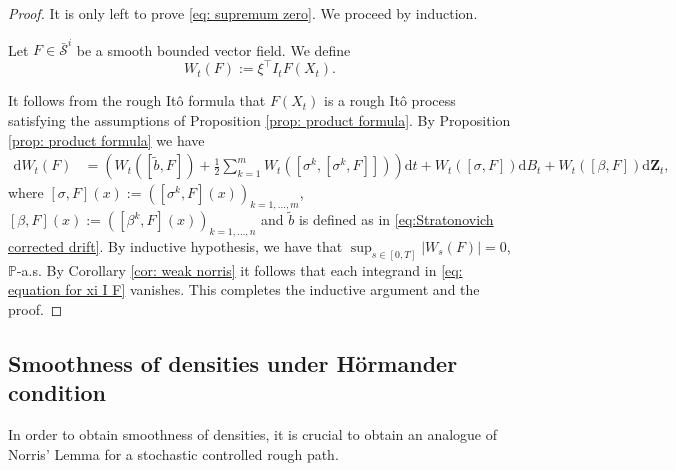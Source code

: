 \documentclass[11pt,a4paper]{article}
\newcommand{\rd}{\mathrm{d}}
\theoremstyle{plain}
\begin{document}
\begin{proof}
    It is only left to prove \eqref{eq: supremum zero}. We proceed by induction.

    Let $F\in \bar{\mathcal{S}}^{i}$ be a smooth  bounded vector field. We define \begin{equation}
    \label{eq: definition of W(F)}
    W_t(F) := \xi^{\top} I_t F(X_t).
    \end{equation}
    
    It follows from the rough It\^o formula \cite[Theorem 4.13]{FHL21} that $F(X_t)$ is a rough It\^o process satisfying the assumptions of Proposition \ref{prop: product formula}.
    By Proposition \ref{prop: product formula} we have
     \begin{align}
    \label{eq: equation for xi I F}
        \rd W_t(F)
        &= 
        \left(W_t([\tilde b,F]) + \frac{1}{2} \sum_{k=1}^{m} W_t([\sigma^k,[\sigma^k,F]])
        \right) \rd t 
         + W_t([\sigma,F]) \rd B_t
        + W_t([\beta,F]) \rd \mathbf{Z}_t,
    \end{align}
    where $[\sigma,F](x) := ([\sigma^k,F](x))_{k=1,\dots,m}$, $[\beta,F](x) := ([\beta^k,F](x))_{k=1,\dots,n}$ and $\tilde b$ is defined as in \eqref{eq:Stratonovich corrected drift}.
    By inductive hypothesis, we have that $\sup_{s\in[0,T]}|W_s(F)| = 0$, $\mathbb{P}$-a.s. By Corollary \ref{cor: weak norris} it follows that each integrand in \eqref{eq: equation for xi I F} vanishes. This completes the inductive argument and the proof.
\end{proof}



\subsection{Smoothness of densities under H\"ormander condition}

In order to obtain smoothness of densities, it is crucial to obtain an analogue of Norris' Lemma for a stochastic controlled rough path.
\end{document}
